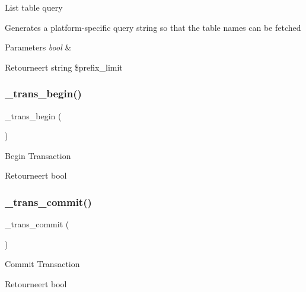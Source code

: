 List table query

Generates a platform-\/specific query string so that the table names can be fetched


\begin{DoxyParams}{Parameters}
{\em bool} & \\
\hline
\end{DoxyParams}
\begin{DoxyReturn}{Retourneert}
string \$prefix\+\_\+limit 
\end{DoxyReturn}
\mbox{\label{class_c_i___d_b__sqlsrv__driver_ac81ac882c1d54347d810199a15856aac}} 
\subsubsection{\texorpdfstring{\_trans\_begin()}{\_trans\_begin()}}
{\footnotesize\ttfamily \+\_\+trans\+\_\+begin (\begin{DoxyParamCaption}{ }\end{DoxyParamCaption})\hspace{0.3cm}{\ttfamily [protected]}}

Begin Transaction

\begin{DoxyReturn}{Retourneert}
bool 
\end{DoxyReturn}
\mbox{\label{class_c_i___d_b__sqlsrv__driver_a6fe7f373e0b11cfae23a5f41c0b35dda}} 
\subsubsection{\texorpdfstring{\_trans\_commit()}{\_trans\_commit()}}
{\footnotesize\ttfamily \+\_\+trans\+\_\+commit (\begin{DoxyParamCaption}{ }\end{DoxyParamCaption})\hspace{0.3cm}{\ttfamily [protected]}}

Commit Transaction

\begin{DoxyReturn}{Retourneert}
bool 
\end{DoxyReturn}
\mbox{\label{class_c_i___d_b__sqlsrv__driver_ad49a116b0776c26b53114c9093fd102a}} 
